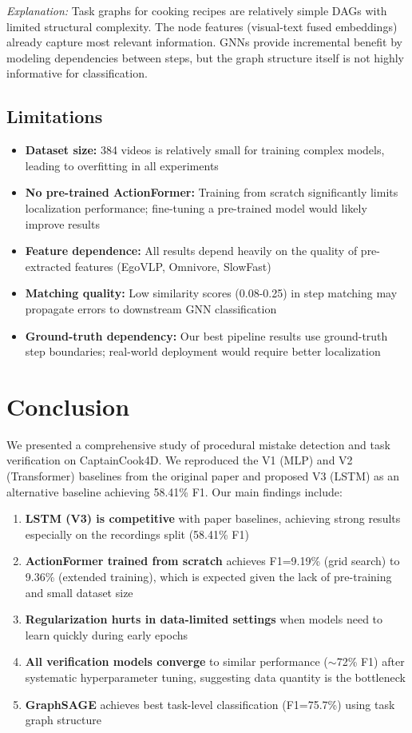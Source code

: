 \documentclass[10pt,twocolumn,letterpaper]{article}
\begin{document}
\textit{Explanation:} Task graphs for cooking recipes are relatively simple DAGs with limited structural complexity. The node features (visual-text fused embeddings) already capture most relevant information. GNNs provide incremental benefit by modeling dependencies between steps, but the graph structure itself is not highly informative for classification.

\subsection{Limitations}

\begin{itemize}
    \item \textbf{Dataset size:} 384 videos is relatively small for training complex models, leading to overfitting in all experiments
    \item \textbf{No pre-trained ActionFormer:} Training from scratch significantly limits localization performance; fine-tuning a pre-trained model would likely improve results
    \item \textbf{Feature dependence:} All results depend heavily on the quality of pre-extracted features (EgoVLP, Omnivore, SlowFast)
    \item \textbf{Matching quality:} Low similarity scores (0.08-0.25) in step matching may propagate errors to downstream GNN classification
    \item \textbf{Ground-truth dependency:} Our best pipeline results use ground-truth step boundaries; real-world deployment would require better localization
\end{itemize}

\section{Conclusion}

We presented a comprehensive study of procedural mistake detection and task verification on CaptainCook4D. We reproduced the V1 (MLP) and V2 (Transformer) baselines from the original paper and proposed V3 (LSTM) as an alternative baseline achieving 58.41\% F1. Our main findings include:

\begin{enumerate}
    \item \textbf{LSTM (V3) is competitive} with paper baselines, achieving strong results especially on the recordings split (58.41\% F1)
    \item \textbf{ActionFormer trained from scratch} achieves F1=9.19\% (grid search) to 9.36\% (extended training), which is expected given the lack of pre-training and small dataset size
    \item \textbf{Regularization hurts in data-limited settings} when models need to learn quickly during early epochs
    \item \textbf{All verification models converge} to similar performance ($\sim$72\% F1) after systematic hyperparameter tuning, suggesting data quantity is the bottleneck
    \item \textbf{GraphSAGE} achieves best task-level classification (F1=75.7\%) using task graph structure
\end{enumerate}
\end{document}
